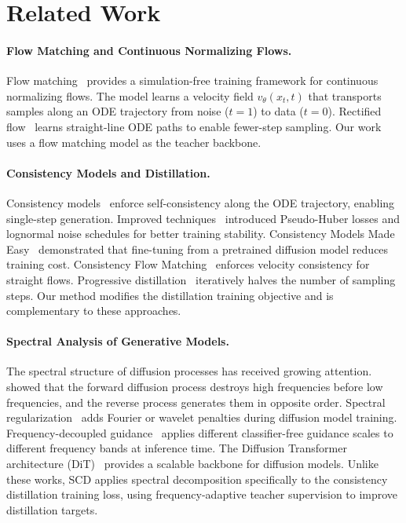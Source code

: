 \documentclass{article}
\newcommand{\scd}{\textsc{SCD}}
\begin{document}
\section{Related Work}
\label{sec:related}

\paragraph{Flow Matching and Continuous Normalizing Flows.}
Flow matching~\citep{lipman2023flow} provides a simulation-free training framework for continuous normalizing flows. The model learns a velocity field $v_\theta(x_t, t)$ that transports samples along an ODE trajectory from noise ($t=1$) to data ($t=0$). Rectified flow~\citep{liu2023flow} learns straight-line ODE paths to enable fewer-step sampling. Our work uses a flow matching model as the teacher backbone.

\paragraph{Consistency Models and Distillation.}
Consistency models~\citep{song2023consistency} enforce self-consistency along the ODE trajectory, enabling single-step generation. Improved techniques~\citep{song2023improved} introduced Pseudo-Huber losses and lognormal noise schedules for better training stability. Consistency Models Made Easy~\citep{geng2024consistency} demonstrated that fine-tuning from a pretrained diffusion model reduces training cost. Consistency Flow Matching~\citep{yang2024consistency} enforces velocity consistency for straight flows. Progressive distillation~\citep{salimans2022progressive} iteratively halves the number of sampling steps. Our method modifies the distillation training objective and is complementary to these approaches.

\paragraph{Spectral Analysis of Generative Models.}
The spectral structure of diffusion processes has received growing attention. \citet{rissanen2023generative} showed that the forward diffusion process destroys high frequencies before low frequencies, and the reverse process generates them in opposite order. Spectral regularization~\citep{chandran2026spectral} adds Fourier or wavelet penalties during diffusion model training. Frequency-decoupled guidance~\citep{sadat2025guidance} applies different classifier-free guidance scales to different frequency bands at inference time. The Diffusion Transformer architecture (DiT)~\citep{peebles2023scalable} provides a scalable backbone for diffusion models. Unlike these works, \scd{} applies spectral decomposition specifically to the consistency distillation training loss, using frequency-adaptive teacher supervision to improve distillation targets.
\end{document}
